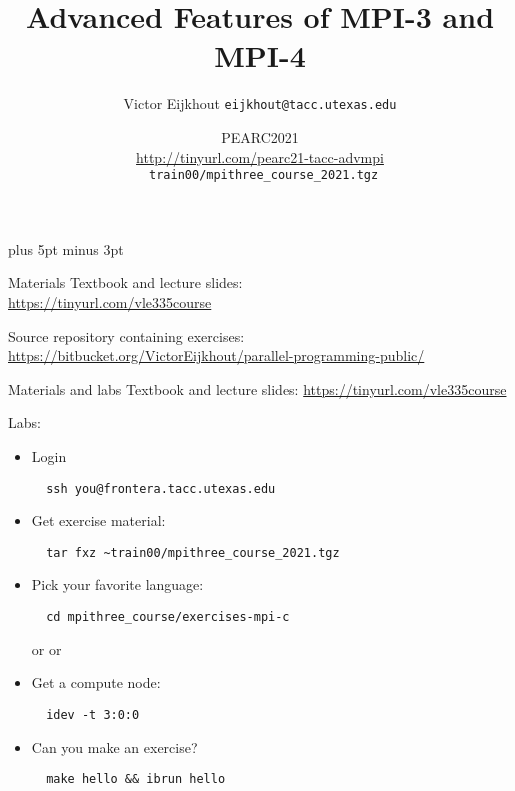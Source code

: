 \documentclass[11pt,headernav]{beamer}
\newcounter{tacc}
\def\Location{}%
\def\courseyear{2021}
\def\Location{TACC APP institute MPI training \courseyear}
\def\Location{TACC/XSEDE MPI training \courseyear}
\def\Location{ISS 2021}
\def\Location{PEARC2021\\
  \small
  \url{http://tinyurl.com/pearc21-tacc-advmpi}\\
  \texttt{\char126 train00/mpithree\_course\_2021.tgz}
}
\begin{document}
\parskip=10pt plus 5pt minus 3pt

\title{Advanced Features of MPI-3 and MPI-4}
\author{Victor Eijkhout {\tt eijkhout@tacc.utexas.edu}}
\date{\Location}

\begin{frame}
  \titlepage
\end{frame}

\begin{xsede}
  
\end{xsede}

\begin{download}
  \begin{frame}[containsverbatim]{Materials}
    Textbook and lecture slides:\\
    \url{https://tinyurl.com/vle335course}
    
    Source repository containing exercises: \\
    \url{https://bitbucket.org/VictorEijkhout/parallel-programming-public/}
  \end{frame}
\end{download}

\begin{lab}
  \begin{frame}[containsverbatim]{Materials and labs}
    Textbook and lecture slides: \url{https://tinyurl.com/vle335course}

    Labs:
    \begin{itemize}
    \item Login
\begin{verbatim}
  ssh you@frontera.tacc.utexas.edu
\end{verbatim}

\item Get exercise material:\\
\begin{verbatim}
  tar fxz ~train00/mpithree_course_2021.tgz
\end{verbatim}

\item Pick your favorite language:\\
\begin{verbatim}
  cd mpithree_course/exercises-mpi-c
\end{verbatim}
  or  or 
\item Get a compute node:
\begin{verbatim}
  idev -t 3:0:0
\end{verbatim}

\item Can you make an exercise?\\
\begin{verbatim}
  make hello && ibrun hello
\end{verbatim}

    \end{itemize}
  \end{frame}
\end{lab}
\end{document}

